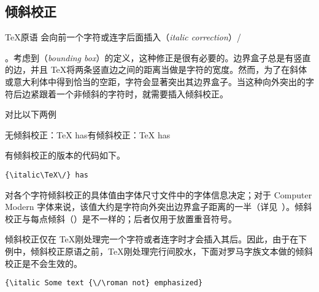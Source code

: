 \documentclass{book}
\begin{document}
\subsection{倾斜校正}

\TeX 原语 \cs{/} 会向前一个字符或连字后面插入（\emph{italic correction}）\cstoidx /\par。考虑到（\emph{bounding box}）的定义，这种修正是很有必要的。边界盒子总是有竖直的边，并且 \TeX 将两条竖直边之间的距离当做是字符的宽度。然而，为了在斜体或意大利体中得到恰当的空距，字符会显著突出其边界盒子。当这种向外突出的字符后边紧跟着一个非倾斜的字符时，就需要插入倾斜校正。

对比以下两例
\begin{Disp}
无倾斜校正：{\italic\TeX} has\quad 有倾斜校正：{\italic\TeX\/} has
\end{Disp}
有倾斜校正的版本的代码如下。
\begin{verbatim}
{\italic\TeX\/} has
\end{verbatim}

对各个字符倾斜校正的具体值由字体尺寸文件中的字体信息决定；对于 Computer Modern 字体来说，该值大约是字符向外突出边界盒子距离的一半（详见~\cite{K:partE}）。倾斜校正与每点倾斜（）是不一样的；后者仅用于放置重音符号。

倾斜校正仅在 \TeX 刚处理完一个字符或者连字时才会插入其后。因此，由于在下例中，倾斜校正原语之前，\TeX 刚处理完行间胶水，下面对罗马字族文本做的倾斜校正是不会生效的。
\begin{verbatim}
{\italic Some text {\/\roman not} emphasized}
\end{verbatim}
\end{document}
